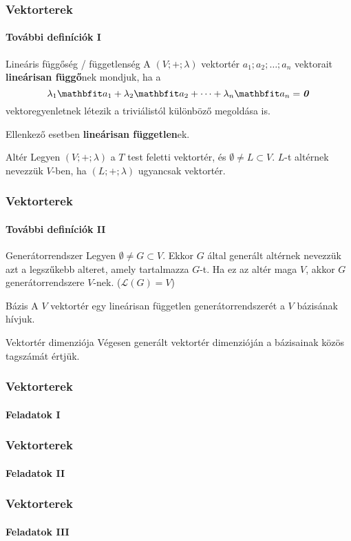 \begin{frame}
  \frametitle{Vektorterek}
  \framesubtitle{További definíciók I}

  \begin{block}{Lineáris függőség / függetlenség}
    A $(V; +; \lambda)$ vektortér $a_1; a_2; \dots; a_n$ vektorait
    \textbf{lineárisan függő}nek mondjuk, ha a
    \[
      \lambda_1 \rvec a_1 +
      \lambda_2 \rvec a_2 +
      \dots +
      \lambda_n \rvec a_n =
      \nvec
    \]
    vektoregyenletnek létezik a triviálistól különböző megoldása is.

    Ellenkező esetben \textbf{lineárisan független}ek.
  \end{block}

  \begin{block}{Altér}
    Legyen $(V; +; \lambda)$ a $T$ test feletti vektortér, és
    $\emptyset \neq L \subset V$. $L$-t altérnek nevezzük $V$-ben, ha
    $(L; +; \lambda)$ ugyancsak vektortér.
  \end{block}
\end{frame}

\begin{frame}
  \frametitle{Vektorterek}
  \framesubtitle{További definíciók II}

  \begin{block}{Generátorrendszer}
    Legyen $\emptyset \neq G \subset V$. Ekkor $G$ által generált altérnek
    nevezzük azt a legszűkebb alteret, amely tartalmazza $G$-t. Ha ez az
    altér maga $V$, akkor $G$ generátorrendszere $V$-nek. ($\mathcal L(G)=V$)
  \end{block}

  \begin{block}{Bázis}
    A $V$ vektortér egy lineárisan független generátorrendszerét a $V$ bázisának
    hívjuk.
  \end{block}

  \begin{block}{Vektortér dimenziója}
    Végesen generált vektortér dimenzióján a bázisainak közös tagszámát értjük.
  \end{block}
\end{frame}

\begin{frame}
  \frametitle{Vektorterek}
  \framesubtitle{Feladatok I}

  
\end{frame}

\begin{frame}
  \frametitle{Vektorterek}
  \framesubtitle{Feladatok II}

  
\end{frame}

\begin{frame}
  \frametitle{Vektorterek}
  \framesubtitle{Feladatok III}

  
\end{frame}
